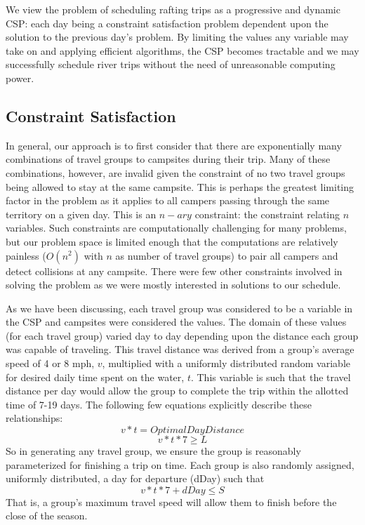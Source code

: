 \documentclass[11pt]{article} %
\begin{document}
We view the problem of scheduling rafting trips as a progressive and dynamic
CSP: each day being a constraint satisfaction problem dependent upon the
solution to the previous day's problem.  By limiting the values any variable
may take on and applying efficient algorithms, the CSP becomes tractable and
we may successfully schedule river trips without the need of unreasonable
computing power.

\subsection{Constraint Satisfaction}
\label{sec:csp}

In general, our approach is to first consider that there are exponentially
many combinations of travel groups to campsites during their trip.  Many of
these combinations, however, are invalid given the constraint of no two
travel groups being allowed to stay at the same campsite.  This is perhaps
the greatest limiting factor in the problem as it applies to all campers
passing through the same territory on a given day.  This is an $n-ary$
constraint: the constraint relating $n$ variables.  Such constraints are
computationally challenging for many problems, but our problem space is limited
enough that the computations are relatively painless ($O(n^2)$ with $n$ as
number of travel groups) to pair all campers and detect collisions at any
campsite.  There were few other constraints involved in solving the problem
as we were mostly interested in solutions to our schedule.

As we have been discussing, each travel group was considered to be a variable
in the CSP and campsites were considered the values.  The domain of these
values (for each travel group) varied day to day depending upon the distance
each group was capable of traveling.  This travel distance was derived from
a group's average speed of 4 or 8 mph, $v$,  multiplied with a uniformly distributed
random variable for desired daily time spent on the water, $t$.  This variable is such
that the travel distance per day would allow the group to complete the trip
within the allotted time of 7-19 days. The following few equations explicitly
describe these relationships:
$$v*t=OptimalDayDistance$$
$$v*t*7\geq L$$
So in generating any travel group, we ensure the group is reasonably
parameterized for finishing a trip on time.  Each group is also randomly
assigned, uniformly distributed, a day for departure (dDay) such that
$$v*t*7+dDay\leq S$$
That is, a group's maximum travel speed will allow them to finish before
the close of the season.
\end{document}
